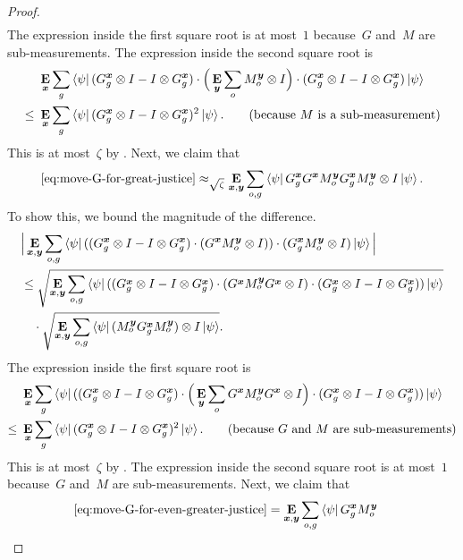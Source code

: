 \begin{proof}
\begin{align*}
\end{align*}
The expression inside the first square root is at most~$1$ because~$G$ and~$M$ are sub-measurements.
The expression inside the second square root is
\begin{align*}
& \mathop{\bf E\/}_{{\boldsymbol{x}}}\sum_g \bra{\psi}(G^{{\boldsymbol{x}}}_g \otimes I - I \otimes G^{{\boldsymbol{x}}}_g) \cdot\Big(\mathop{\bf E\/}_{\boldsymbol{y}} \sum_o M^{\boldsymbol{y}}_{o} \otimes I\Big) \cdot (G^{{\boldsymbol{x}}}_g \otimes I - I \otimes G^{{\boldsymbol{x}}}_g) \ket{\psi}\\
\leq~&\mathop{\bf E\/}_{{\boldsymbol{x}}}\sum_g \bra{\psi}(G^{{\boldsymbol{x}}}_g \otimes I - I \otimes G^{{\boldsymbol{x}}}_g)^2 \ket{\psi}. \tag{because~$M$ is a sub-measurement}
\end{align*} 
This is at most~$\zeta$ by .
Next, we claim that
\begin{equation}\label{eq:move-G-for-even-greater-justice}
\eqref{eq:move-G-for-great-justice}
\approx_{\sqrt{\zeta}} \mathop{\bf E\/}_{{\boldsymbol{x}}, \boldsymbol{y}} \sum_{o, g}  \bra{\psi}  G^{{\boldsymbol{x}}}_g  G^{{\boldsymbol{x}}} M^{\boldsymbol{y}}_o
        G^{{\boldsymbol{x}}}_{g} M^{\boldsymbol{y}}_o \otimes I\ket{\psi}.
\end{equation}
To show this, we bound the magnitude of the difference.
\begin{align*}
&\Big|  \mathop{\bf E\/}_{{\boldsymbol{x}}, \boldsymbol{y}} \sum_{o, g}  \bra{\psi} ((G^{{\boldsymbol{x}}}_g \otimes I - I \otimes G^{{\boldsymbol{x}}}_g) \cdot (G^{{\boldsymbol{x}}} M^{\boldsymbol{y}}_o \otimes I)) 
	\cdot  (G^{{\boldsymbol{x}}}_{g} M^{\boldsymbol{y}}_o \otimes I) 
        \ket{\psi}\Big|\\
&\leq \sqrt{ \mathop{\bf E\/}_{{\boldsymbol{x}}, \boldsymbol{y}} \sum_{o, g}  \bra{\psi} ((G^{{\boldsymbol{x}}}_g \otimes I - I \otimes G^{{\boldsymbol{x}}}_g) \cdot (G^{{\boldsymbol{x}}} M^{\boldsymbol{y}}_o G^{{\boldsymbol{x}}} \otimes I) \cdot (G^{{\boldsymbol{x}}}_g \otimes I - I \otimes G^{{\boldsymbol{x}}}_g))\ket{\psi}}\\
&\quad \cdot \sqrt{ \mathop{\bf E\/}_{{\boldsymbol{x}}, \boldsymbol{y}} \sum_{o, g}  \bra{\psi}  (M^{\boldsymbol{y}}_{o} G^{{\boldsymbol{x}}}_g M^{\boldsymbol{y}}_o) \otimes I \ket{\psi}}.
\end{align*}
The expression inside the first square root is
\begin{align*}
& \mathop{\bf E\/}_{{\boldsymbol{x}}} \sum_{g}  \bra{\psi} ((G^{{\boldsymbol{x}}}_g \otimes I - I \otimes G^{{\boldsymbol{x}}}_g) \cdot \Big(\mathop{\bf E\/}_{\boldsymbol{y}} \sum_o G^{{\boldsymbol{x}}} M^{\boldsymbol{y}}_o G^{{\boldsymbol{x}}} \otimes I\Big) \cdot (G^{{\boldsymbol{x}}}_g \otimes I - I \otimes G^{{\boldsymbol{x}}}_g))\ket{\psi}\\
\leq~&\mathop{\bf E\/}_{{\boldsymbol{x}}} \sum_{g}  \bra{\psi} (G^{{\boldsymbol{x}}}_g \otimes I - I \otimes G^{{\boldsymbol{x}}}_g)^2\ket{\psi}. \tag{because~$G$ and~$M$ are sub-measurements}
\end{align*} 
This is at most~$\zeta$ by .
The expression inside the second square root is at most~$1$ because~$G$ and~$M$ are sub-measurements.
Next, we claim that
\begin{align}
\eqref{eq:move-G-for-even-greater-justice}
& = \E_{\bx, \by} \sum_{o, g}  \bra{\psi}   G^{\bx}_{g} M^{\by}_o

\end{align}
\end{proof}
